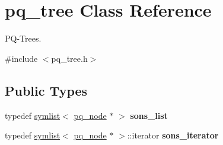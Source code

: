 \hypertarget{classpq__tree}{}\section{pq\+\_\+tree Class Reference}
\label{classpq__tree}


P\+Q-\/\+Trees.  




{\ttfamily \#include $<$pq\+\_\+tree.\+h$>$}

\subsection*{Public Types}
\begin{DoxyCompactItemize}
\item 
\mbox{\label{classpq__tree_a241e516724fdb5ca21239772164458f3}} 
typedef \mbox{\hyperlink{classsymlist}{symlist}}$<$ \mbox{\hyperlink{classpq__node}{pq\+\_\+node}} $\ast$ $>$ {\bfseries sons\+\_\+list}
\item 
\mbox{\label{classpq__tree_ab47263066d4b0acc70e00043870d748a}} 
typedef \mbox{\hyperlink{classsymlist}{symlist}}$<$ \mbox{\hyperlink{classpq__node}{pq\+\_\+node}} $\ast$ $>$\+::iterator {\bfseries sons\+\_\+iterator}
\end{DoxyCompactItemize}
